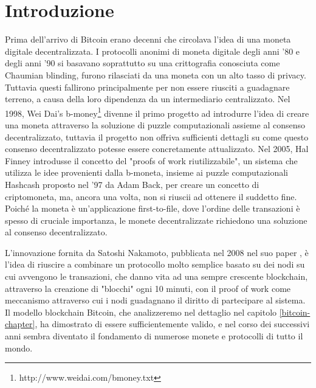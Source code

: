 
\cleardoublepage
{}

\chapter*{Introduzione}
Prima dell'arrivo di Bitcoin erano decenni che circolava l'idea di una moneta digitale decentralizzata. I protocolli anonimi di moneta digitale degli anni '80 e degli anni '90 si basavano soprattutto su una crittografia conosciuta come Chaumian blinding, furono rilasciati da una moneta con un alto tasso di privacy. Tuttavia questi fallirono principalmente per non essere riusciti a guadagnare terreno, a causa della loro dipendenza da un intermediario centralizzato. Nel 1998, Wei Dai's b-money\footnote{http://www.weidai.com/bmoney.txt} divenne il primo progetto ad introdurre l'idea di creare una moneta attraverso la soluzione di puzzle computazionali assieme al consenso decentralizzato, tuttavia il progetto non offriva sufficienti dettagli su come questo consenso decentralizzato potesse essere concretamente attualizzato. Nel 2005, Hal Finney introdusse il concetto del "proofs of work riutilizzabile", un sistema che utilizza le idee provenienti dalla b-moneta, insieme ai puzzle computazionali Hashcash proposto nel '97 da Adam Back, per creare un concetto di criptomoneta, ma, ancora una volta, non si riuscii ad ottenere il suddetto fine. Poiché la moneta è un'applicazione first-to-file, dove l'ordine delle transazioni è spesso di cruciale importanza, le monete decentralizzate richiedono una soluzione al consenso decentralizzato. 

L'innovazione fornita da Satoshi Nakamoto, pubblicata nel 2008 nel suo paper \cite{paper-bitcoin:satoshi}, è l'idea di riuscire a combinare un protocollo molto semplice basato su dei nodi su cui avvengono le transazioni, che danno vita ad una sempre crescente blockchain, attraverso la creazione di "blocchi" ogni 10 minuti, con il proof of work come meccanismo attraverso cui i nodi guadagnano il diritto di partecipare al sistema. Il modello blockchain Bitcoin, che analizzeremo nel dettaglio nel capitolo \ref{bitcoin-chapter}, ha dimostrato di essere sufficientemente valido, e nel corso dei successivi anni sembra diventato il fondamento di numerose monete e protocolli di tutto il mondo. 

